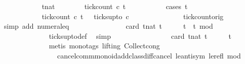 \begin{isabellebody}
\ \ \isamarkupfalse%
\ {\isacharminus}\isanewline
\ \ \ \ \isacommand{{\isacharbraceleft}}\isamarkupfalse%
\ \isamarkupfalse%
\ tnat\isanewline
\ \ \ \ \ \ \isamarkupfalse%
\ {\isacartoucheopen}tick{\isacharunderscore}count\ c{}\ t\ {}\ {\isasymle}\ {}{\isacartoucheclose}\isanewline
\ \ \ \ \ \ \isamarkupfalse%
\ {\isacharparenleft}cases\ t\isanewline
\ \ \ \ \ \ \ \ \isamarkupfalse%
\ {}\isanewline
\ \ \ \ \ \ \ \ \ \ \isamarkupfalse%
\ {\isacartoucheopen}tick{\isacharunderscore}count\ c{}\ t\ {}\ {\isacharequal}\ ticks{\isacharunderscore}up{\isacharunderscore}to\ c{}\ {}{\isacartoucheclose}\isanewline
\ \ \ \ \ \ \ \ \ \ \ \ \isamarkupfalse%
\ tick{\isacharunderscore}count{\isacharunderscore}orig\ \isamarkupfalse%
\ {\isacharparenleft}simp\ add{\isacharcolon}\ numeral{\isacharunderscore}{}{\isacharunderscore}eq{\isacharunderscore}{}{\isacharparenright}\isanewline
\ \ \ \ \ \ \ \ \ \ \isamarkupfalse%
\ \isamarkupfalse%
\ {\isacartoucheopen}{\isachardot}{\isachardot}{\isachardot}\ {\isacharequal}\ card\ {\isacharbraceleft}t{\isacharcolon}{\isacharcolon}nat{\isachardot}\ t\ {\isasymle}\ {}\ {\isasymand}\ {}\ {\isasymle}\ t\ {\isasymand}\ {\isacharparenleft}t{\isacharminus}{}{\isacharparenright}\ mod\ {}\ {\isacharequal}\ {}{\isacharbraceright}{\isacartoucheclose}\isanewline
\ \ \ \ \ \ \ \ \ \ \ \ \isamarkupfalse%
\ ticks{\isacharunderscore}up{\isacharunderscore}to{\isacharunderscore}def\ \isamarkupfalse%
\ simp\isanewline
\ \ \ \ \ \ \ \ \ \ \isamarkupfalse%
\ \isamarkupfalse%
\ {\isacartoucheopen}{\isachardot}{\isachardot}{\isachardot}\ {\isasymle}\ \ card\ {\isacharbraceleft}t{\isacharcolon}{\isacharcolon}nat{\isachardot}\ t\ {\isasymle}\ {}\ {\isasymand}\ {}\ {\isasymle}\ t{\isacharbraceright}{\isacartoucheclose}\isanewline
\ \ \ \ \ \ \ \ \ \ \ \ \isamarkupfalse%
\ {\isacharparenleft}metis\ {\isacharparenleft}mono{\isacharunderscore}tags{\isacharcomma}\ lifting{\isacharparenright}\ Collect{\isacharunderscore}cong\isanewline
\ \ \ \ \ \ \ \ \ \ \ \ \ \ \ \ cancel{\isacharunderscore}comm{\isacharunderscore}monoid{\isacharunderscore}add{\isacharunderscore}class{\isachardot}diff{\isacharunderscore}cancel\ le{\isacharunderscore}antisym\ le{\isacharunderscore}refl\ mod{\isacharunderscore}{}{\isacharparenright}\isanewline

\end{isabellebody}
